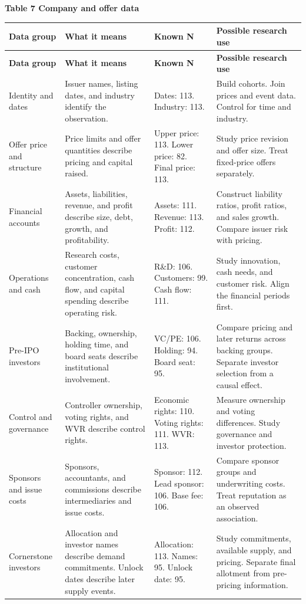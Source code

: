 \documentclass[10pt,a4paper]{article}
\begin{document}
\par\addvspace{5pt}
\noindent\textbf{Table 7  Company and offer data}
\par\nobreak\vspace{2pt}
{\small
\setlength{\tabcolsep}{4pt}
\renewcommand{\arraystretch}{1.08}
\setlength{\LTpre}{0pt}\setlength{\LTpost}{3pt}
\begin{longtable}{@{}>{\raggedright\arraybackslash}p{2.5660cm}>{\raggedright\arraybackslash}p{4.2767cm}>{\raggedright\arraybackslash}p{3.0412cm}>{\raggedright\arraybackslash}p{6.2725cm}@{}}
\toprule
\textbf{Data group} & \textbf{What it means} & \textbf{Known N} & \textbf{Possible research use} \\
\midrule\endfirsthead
\toprule
\textbf{Data group} & \textbf{What it means} & \textbf{Known N} & \textbf{Possible research use} \\
\midrule\endhead
\bottomrule\endfoot
Identity and dates & Issuer names, listing dates, and industry identify the observation. & Dates: 113. Industry: 113. & Build cohorts. Join prices and event data. Control for time and industry. \\
Offer price and structure & Price limits and offer quantities describe pricing and capital raised. & Upper price: 113. Lower price: 82. Final price: 113. & Study price revision and offer size. Treat fixed-price offers separately. \\
Financial accounts & Assets, liabilities, revenue, and profit describe size, debt, growth, and profitability. & Assets: 111. Revenue: 113. Profit: 112. & Construct liability ratios, profit ratios, and sales growth. Compare issuer risk with pricing. \\
Operations and cash & Research costs, customer concentration, cash flow, and capital spending describe operating risk. & R\&D: 106. Customers: 99. Cash flow: 111. & Study innovation, cash needs, and customer risk. Align the financial periods first. \\
Pre-IPO investors & Backing, ownership, holding time, and board seats describe institutional involvement. & VC/PE: 106. Holding: 94. Board seat: 95. & Compare pricing and later returns across backing groups. Separate investor selection from a causal effect. \\
Control and governance & Controller ownership, voting rights, and WVR describe control rights. & Economic rights: 110. Voting rights: 111. WVR: 113. & Measure ownership and voting differences. Study governance and investor protection. \\
Sponsors and issue costs & Sponsors, accountants, and commissions describe intermediaries and issue costs. & Sponsor: 112. Lead sponsor: 106. Base fee: 106. & Compare sponsor groups and underwriting costs. Treat reputation as an observed association. \\
Cornerstone investors & Allocation and investor names describe demand commitments. Unlock dates describe later supply events. & Allocation: 113. Names: 95. Unlock date: 95. & Study commitments, available supply, and pricing. Separate final allotment from pre-pricing information. \\
\end{longtable}
}\par\addvspace{3pt}
\end{document}
